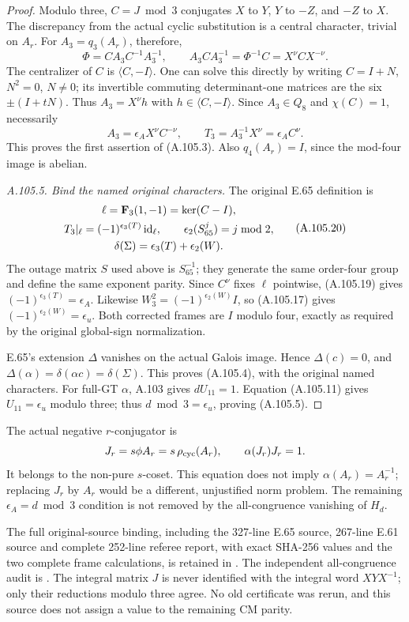 \begin{proof}
Modulo three, \(C=J\bmod3\) conjugates \(X\) to \(Y\), \(Y\)
to \(-Z\), and \(-Z\) to \(X\). The discrepancy from the actual
cyclic substitution is a central character, trivial on \(A_r\).
For \(A_3=q_3(A_r)\), therefore,
\[
 \Phi=CA_3C^{-1}A_3^{-1},\qquad
 A_3CA_3^{-1}=\Phi^{-1}C=X^\nu CX^{-\nu}.
\tag{A.105.18}
\]
The centralizer of \(C\) is
\(\langle C,-I\rangle\). One can solve this directly by
writing \(C=I+N\), \(N^2=0\), \(N\ne0\); its invertible
commuting determinant-one matrices are the six
\(\pm(I+tN)\). Thus \(A_3=X^\nu h\) with
\(h\in\langle C,-I\rangle\). Since \(A_3\in Q_8\) and
\(\chi(C)=1\), necessarily
\[
 A_3=\epsilon_A X^\nu C^{-\nu},\qquad
 T_3=A_3^{-1}X^\nu=\epsilon_A C^\nu.
\tag{A.105.19}
\]
This proves the first assertion of (A.105.3).
Also \(q_4(A_r)=I\), since the mod-four image is abelian.

\emph{A.105.5. Bind the named original characters.}
The original E.65 definition is
\[
\begin{gathered}
 \ell=\mathbf F_3(1,-1)=\ker(C-I),\\
 T_3|_\ell=(-1)^{\epsilon_3(T)}\,{\rm id}_\ell,\qquad
 \epsilon_2(S_{65}^j)=j\bmod2,\\
 \delta(\Sigma)=\epsilon_3(T)+\epsilon_2(W).
\end{gathered}
\tag{A.105.20}
\]
The outage matrix \(S\) used above is \(S_{65}^{-1}\); they
generate the same order-four group and define the same exponent
parity. Since \(C^\nu\) fixes \(\ell\) pointwise, (A.105.19)
gives \((-1)^{\epsilon_3(T)}=\epsilon_A\). Likewise
\(W_3^2=(-1)^{\epsilon_2(W)}I\), so (A.105.17) gives
\((-1)^{\epsilon_2(W)}=\epsilon_u\). Both corrected frames
are \(I\) modulo four, exactly as required by the original
global-sign normalization.

E.65's extension \(\Delta\) vanishes on the actual Galois
image. Hence \(\Delta(c)=0\), and
\(\Delta(\alpha)=\delta(\alpha c)=\delta(\Sigma)\).
This proves (A.105.4), with the original named characters.
For full-GT \(\alpha\), A.103 gives \(dU_{11}=1\).
Equation (A.105.11) gives \(U_{11}=\epsilon_u\) modulo three;
thus \(d\bmod3=\epsilon_u\), proving (A.105.5).
\end{proof}

The actual negative \(r\)-conjugator is
\[
 J_r=s\phi A_r=s\,\rho_{\rm cyc}(A_r),\qquad
 \alpha(J_r)J_r=1.
\]
It belongs to the non-pure \(s\)-coset. This equation does not
imply \(\alpha(A_r)=A_r^{-1}\); replacing \(J_r\) by \(A_r\)
would be a different, unjustified norm problem. The remaining
\(\epsilon_A=d\bmod3\) condition is not removed by the
all-congruence vanishing of \(H_d\).

{\small\raggedright
The full original-source binding, including the 327-line E.65
source, 267-line E.61 source and complete 252-line referee report,
with exact SHA-256 values and the two complete frame calculations,
is retained in
.
The independent all-congruence audit is
.
The integral matrix \(J\) is never identified with the integral
word \(XYX^{-1}\); only their reductions modulo three agree.
No old certificate was rerun, and this source does not assign a
value to the remaining CM parity.\par}
